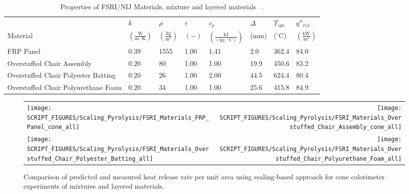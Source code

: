 \begin{table}[!h]
\caption[Properties of FSRI/NIJ Materials, mixture and layered materials]{Properties of FSRI/NIJ Materials, mixture and layered materials ~\cite{McKinnon:FSRI2023_Data}.}
\centering
\begin{tabular}{|p{5.5cm}|p{1.0cm}|p{1.0cm}|p{0.8cm}|p{1.4cm}|p{1.0cm}|p{1.0cm}|p{1.2cm}|}
\hline
                                               & $k$    & $\rho$      & $\varepsilon$   & $c_{p}$ & $\Delta$    & $T_{ign}$ & $q''_{ref}$ \\
Material                                       & $\mathrm{\left(\frac{W}{m\cdot K}\right)}$ & $\mathrm{\left(\frac{kg}{m^{3}}\right)}$ & $\mathrm{( - )}$ & $\mathrm{\left(\frac{kJ}{(kg\cdot ^{\circ}C)}\right)}$ &  ($\mathrm{mm}$)   & ($\mathrm{^{\circ}C}$) & $\mathrm{\left(\frac{kW}{m^{2}}\right)}$ \\ \hline
\hline
FRP Panel & 0.39 & 1555 & 1.00 & 1.41 & 2.0 & 362.4 & 84.0 \\ \hline 
Overstuffed Chair Assembly & 0.20 & 80 & 1.00 & 1.00 & 19.9 & 450.6 & 83.2 \\ \hline 
Overstuffed Chair Polyester Batting & 0.20 & 26 & 1.00 & 2.00 & 44.5 & 624.4 & 80.4 \\ \hline 
Overstuffed Chair Polyurethane Foam & 0.20 & 34 & 1.00 & 1.00 & 25.6 & 415.8 & 84.9 \\ \hline 
\end{tabular}
\label{Properties_FSRI_NIJ_Materials_mixtures}
\end{table}

\begin{figure}[p]
\begin{tabular*}{\textwidth}{l@{\extracolsep{\fill}}r}
\texttt{[image: SCRIPT\_FIGURES/Scaling\_Pyrolysis/FSRI\_Materials\_FRP\_Panel\_cone\_all]} &
\texttt{[image: SCRIPT\_FIGURES/Scaling\_Pyrolysis/FSRI\_Materials\_Overstuffed\_Chair\_Assembly\_cone\_all]} \\
\texttt{[image: SCRIPT\_FIGURES/Scaling\_Pyrolysis/FSRI\_Materials\_Overstuffed\_Chair\_Polyester\_Batting\_all]} &
\texttt{[image: SCRIPT\_FIGURES/Scaling\_Pyrolysis/FSRI\_Materials\_Overstuffed\_Chair\_Polyurethane\_Foam\_all]} \\
\end{tabular*}
\caption[Heat release rate per unit area of FSRI materials using scaling model, mixtures and layered materials]
{Comparison of predicted and measured heat release rate per unit area using scaling-based approach for cone calorimeter experiments of mixtures and layered materials.}
\label{FSRI_Materials_mixtures}
\end{figure}

